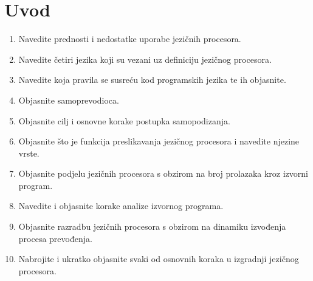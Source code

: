 \documentclass[times, 12pt, utf8]{book}
\begin{document}

\chapter{Uvod}


\begin{enumerate}

\item
Navedite prednosti i nedostatke uporabe jezičnih procesora. \cite[str.~1]{udzbenik}

\item
Navedite četiri jezika koji su vezani uz definiciju jezičnog procesora. \cite[str.~3]{udzbenik}

\item
Navedite koja pravila se susreću kod programskih jezika te ih objasnite. \cite[str.~4-11]{udzbenik}

\item
Objasnite samoprevodioca. \cite[str.~27]{udzbenik}

\item
Objasnite cilj i osnovne korake postupka samopodizanja. \cite[str.~3]{udzbenik}

\item
Objasnite što je funkcija preslikavanja jezičnog procesora i navedite njezine vrste. \cite[str.~26]{udzbenik}

\item
Objasnite podjelu jezičnih procesora s obzirom na broj prolazaka kroz izvorni program. \cite[str.~24-26]{udzbenik}

\item
Navedite i objasnite korake analize izvornog programa. \cite[str.~3-13]{udzbenik}

\item
Objasnite razradbu jezičnih procesora s obzirom na dinamiku izvođenja procesa prevođenja. \cite[str.~24-26]{udzbenik}

\item
Nabrojite i ukratko objasnite svaki od osnovnih koraka u izgradnji jezičnog procesora. \cite[str.~3]{udzbenik}


\end{enumerate}
\end{document}
